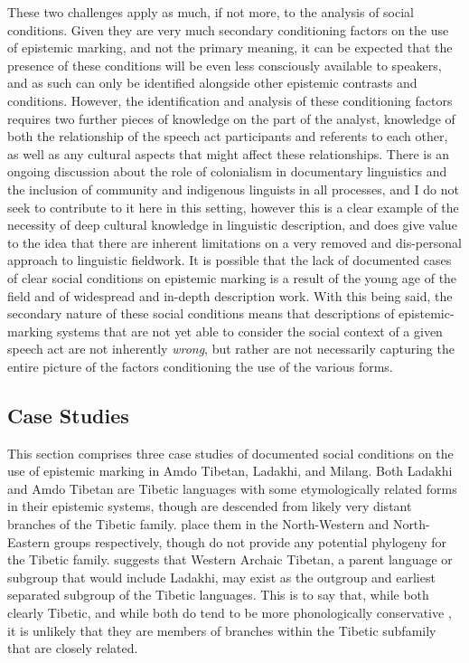 These two challenges apply as much, if not more, to the analysis of social conditions. Given they are very much secondary conditioning factors on the use of epistemic marking, and not the primary meaning, it can be expected that the presence of these conditions will be even less consciously available to speakers, and as such can only be identified alongside other epistemic contrasts and conditions. However, the identification and analysis of these conditioning factors requires two further pieces of knowledge on the part of the analyst, knowledge of both the relationship of the speech act participants and referents to each other, as well as any cultural aspects that might affect these relationships. There is an ongoing discussion about the role of colonialism in documentary linguistics and the inclusion of community and indigenous linguists in all processes, and I do not seek to contribute to it here in this setting, however this is a clear example of the necessity of deep cultural knowledge in linguistic description, and does give value to the idea that there are inherent limitations on a very removed and dis-personal approach to linguistic fieldwork. It is possible that the lack of documented cases of clear social conditions on epistemic marking is a result of the young age of the field and of widespread and in-depth description work. With this being said, the secondary nature of these social conditions means that descriptions of epistemic-marking systems that are not yet able to consider the social context of a given speech act are not inherently \textit{wrong}, but rather are not necessarily capturing the entire picture of the factors conditioning the use of the various forms.

\subsection{Case Studies}\label{ss:Discussion:SocialCases}
This section comprises three case studies of documented social conditions on the use of epistemic marking in Amdo Tibetan, Ladakhi, and Milang. Both Ladakhi and Amdo Tibetan are Tibetic languages with some etymologically related forms in their epistemic systems, though are descended from likely very distant branches of the Tibetic family.  place them in the North-Western and North-Eastern groups respectively, though do not provide any potential phylogeny for the Tibetic family.  suggests that Western Archaic Tibetan, a parent language or subgroup that would include Ladakhi, may exist as the outgroup and earliest separated subgroup of the Tibetic languages. This is to say that, while both clearly Tibetic, and while both do tend to be more phonologically conservative \cites{Tribur2019}{Zemp2018}, it is unlikely that they are members of branches within the Tibetic subfamily that are closely related.

